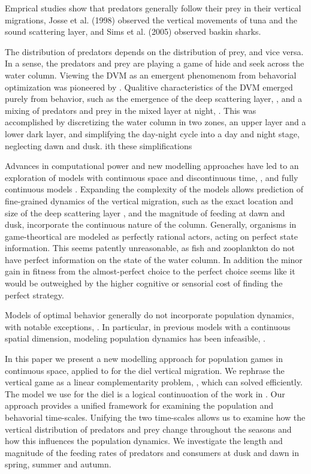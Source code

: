 Emprical studies show that predators generally follow their prey in their vertical migrations, Josse et al. (1998) observed the
vertical movements of tuna and the sound scattering layer,
and Sims et al. (2005) observed baskin sharks.


The distribution of predators depends on the distribution of prey, and vice versa. In a sense, the predators and prey are playing a game of hide and seek across the water column. Viewing the DVM as an emergent phenomenom from behavorial optimization was pioneered by \citep{Iwasawa}. Qualitive characteristics of the DVM emerged purely from behavior, such as the emergence of the deep scattering layer, \citep{}, and a mixing of predators and prey in the mixed layer at night, \citep{}. This was accomplished by discretizing the water column in two zones, an upper layer and a lower dark layer, and simplifying the day-night cycle into a day and night stage, neglecting dawn and dusk. ith these simplifications

Advances in computational power and new modelling approaches have led to an exploration of models with continuous space and discontinuous time, \citep{verticaljerome}, and fully continuous models \citep{verticaluffe}.
Expanding the complexity of the models allows prediction of fine-grained dynamics of the vertical migration, such as the exact location and size of the deep scattering layer \citep{verticaljerome,verticaluffe}, and the magnitude of feeding at dawn and dusk, \citep{verticaluffe} incorporate the continuous nature of the column.
Generally, organisms in game-theortical are modeled as perfectly rational actors, acting on perfect state information. This seems patently unreasonable, as fish and zooplankton do not have perfect information on the state of the water column. In addition the minor gain in fitness from the almost-perfect choice to the perfect choice seems like it would be outweighed by the higher cognitive or sensorial cost of finding the perfect strategy.


Models of optimal behavior generally do not incorporate population dynamics, with notable exceptions, \citep{krivan,lake}. In particular, in previous models with a continuous spatial dimension, modeling population dynamics has been infeasible, \citep{.., ..}.


In this paper we present a new modelling approach for population games in continuous space, applied to for the diel vertical migration. We rephrase the vertical game as a linear complementarity problem, \citep{miller1991copositive}, which can solved efficiently. The model we use for the diel is a logical continuoation of the work in \citep{}.
Our approach provides a unified framework for examining the population and behavorial time-scales.  Unifying the two time-scales allows us to examine how the vertical distribution of predators and prey change throughout the seasons and how this influences the population dynamics. We investigate the length and magnitude of the feeding rates of predators and consumers at dusk and dawn in spring, summer and autumn.

